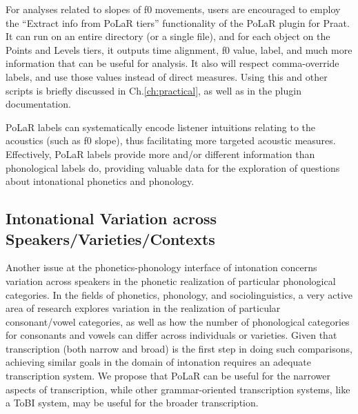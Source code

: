 \documentclass[11pt, twoside]{memoir}
\begin{document}
\begin{infobox}
For analyses related to slopes of f0 movements, users are encouraged to employ the “Extract info from PoLaR tiers” functionality of the PoLaR plugin for Praat. It can run on an entire directory (or a single file), and for each object on the Points and Levels tiers, it outputs time alignment, f0 value, label, and much more information that can be useful for analysis. It also will respect comma-override labels, and use those values instead of direct measures. Using this and other scripts is briefly discussed in Ch.\ref{ch:practical}, as well as in the plugin documentation.	
\end{infobox}

PoLaR labels can systematically encode listener intuitions relating to the acoustics (such as f0 slope), thus facilitating more targeted acoustic measures. Effectively, PoLaR labels provide more and/or different information than phonological labels do, providing valuable data for the exploration of questions about intonational phonetics and phonology.

\subsection{Intonational Variation across Speakers\slash Varieties\slash Contexts}\label{sec:interspeaker-variation-in-realization-of-prosodic-categories}

Another issue at the phonetics-phonology interface of intonation concerns variation across speakers in the phonetic realization of particular phonological categories. In the fields of phonetics, phonology, and sociolinguistics, a very active area of research explores variation in the realization of particular consonant\slash vowel categories, as well as how the number of phonological categories for consonants and vowels can differ across individuals or varieties. Given that transcription (both narrow and broad) is the first step in doing such comparisons, achieving similar goals in the domain of intonation requires an adequate transcription system. We propose that PoLaR can be useful for the narrower aspects of transcription, while other grammar-oriented transcription systems, like a ToBI system, may be useful for the broader transcription.
\end{document}
